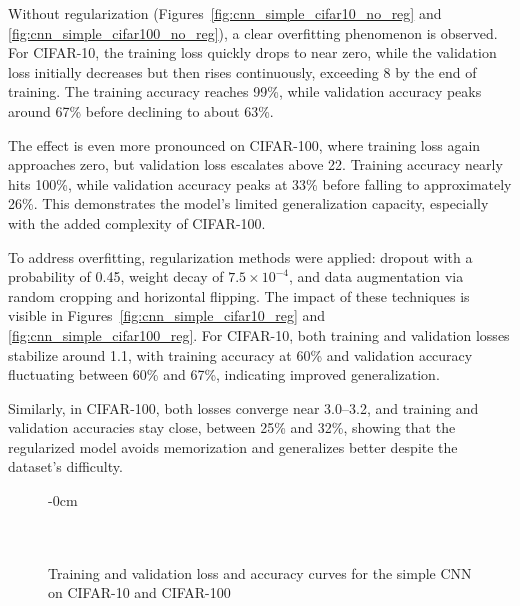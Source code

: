 \documentclass[journal,article,submit,pdftex,moreauthors]{Definitions/mdpi}
\begin{document}
Without regularization (Figures~\ref{fig:cnn_simple_cifar10_no_reg} and \ref{fig:cnn_simple_cifar100_no_reg}), a clear overfitting phenomenon is observed. For CIFAR-10, the training loss quickly drops to near zero, while the validation loss initially decreases but then rises continuously, exceeding 8 by the end of training. The training accuracy reaches 99\%, while validation accuracy peaks around 67\% before declining to about 63\%. 

The effect is even more pronounced on CIFAR-100, where training loss again approaches zero, but validation loss escalates above 22. Training accuracy nearly hits 100\%, while validation accuracy peaks at 33\% before falling to approximately 26\%. This demonstrates the model’s limited generalization capacity, especially with the added complexity of CIFAR-100.

To address overfitting, regularization methods were applied: dropout with a probability of 0.45, weight decay of $7.5 \times 10^{-4}$, and data augmentation via random cropping and horizontal flipping. The impact of these techniques is visible in Figures~\ref{fig:cnn_simple_cifar10_reg} and \ref{fig:cnn_simple_cifar100_reg}. For CIFAR-10, both training and validation losses stabilize around 1.1, with training accuracy at 60\% and validation accuracy fluctuating between 60\% and 67\%, indicating improved generalization.

Similarly, in CIFAR-100, both losses converge near 3.0–3.2, and training and validation accuracies stay close, between 25\% and 32\%, showing that the regularized model avoids memorization and generalizes better despite the dataset's difficulty.


\begin{figure}[H]
\begin{adjustwidth}{-\extralength}{0cm}
\centering
{}\\[0.5em]
\\[0.5em]
\\[0.5em]
\end{adjustwidth}
\caption{Training and validation loss and accuracy curves for the simple CNN on CIFAR-10 and CIFAR-100}
\end{figure}
\end{document}
